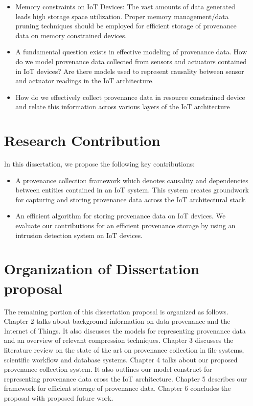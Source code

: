 \begin{itemize}

\item Memory constraints on IoT Devices: The vast amounts of data generated leads high storage space utilization. Proper memory management/data pruning techniques should be employed for efficient storage of provenance data on memory constrained devices. 

\item A fundamental question exists in effective modeling of provenance data. How do we model provenance data collected from sensors and actuators contained in IoT devices? Are there models used to represent causality between sensor and actuator readings in the IoT architecture.

\item How do we effectively collect provenance data in resource constrained device and relate this information across various layers of the IoT architecture

\end{itemize}

\section{Research Contribution}

In this dissertation, we propose the following key contributions:

\begin{itemize}
  \item A provenance collection framework which denotes causality and dependencies between entities contained in an IoT system. This system creates groundwork for capturing and storing provenance data  across the IoT architectural stack.
  \item An efficient algorithm for storing provenance data on IoT devices. We evaluate our contributions for an efficient provenance storage by using an intrusion detection system on IoT devices.
\end{itemize}

\section{Organization of Dissertation proposal}

The remaining portion of this dissertation proposal is organized as follows. Chapter 2 talks about background information on data provenance and the Internet of Things. It also discusses the models for representing provenance data and an overview of relevant compression techniques. Chapter 3 discusses the literature review on the state of the art on provenance collection in file systems, scientific workflow and database systems. Chapter 4 talks about our proposed provenance collection system. It also outlines our model construct for representing provenance data cross the IoT architecture. Chapter 5 describes our framework for efficient storage of provenance data. Chapter 6 concludes the proposal with proposed future work.

